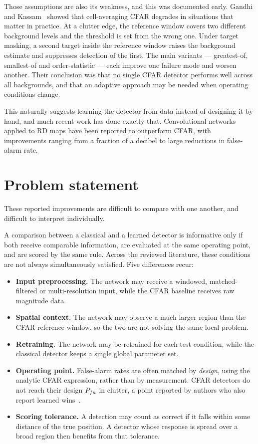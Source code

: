Those assumptions are also its weakness, and this was documented early. Gandhi and
Kassam~\cite{gandhi1988cfar} showed that cell-averaging CFAR degrades in situations that matter in
practice. At a clutter edge, the reference window covers two different background levels and the
threshold is set from the wrong one. Under target masking, a second target inside the reference
window raises the background estimate and suppresses detection of the first. The main variants ---
greatest-of, smallest-of and order-statistic --- each improve one failure mode and worsen another.
Their conclusion was that no single CFAR detector performs well across all backgrounds, and that an
adaptive approach may be needed when operating conditions change.

This naturally suggests learning the detector from data instead of designing it by hand, and much
recent work has done exactly that. Convolutional networks applied to RD maps have been reported to
outperform CFAR, with improvements ranging from a fraction of a decibel to large reductions in
false-alarm rate.

\section{Problem statement}
\label{sec:problem}

These reported improvements are difficult to compare with one another, and difficult to interpret
individually.

A comparison between a classical and a learned detector is informative only if both receive
comparable information, are evaluated at the same operating point, and are scored by the same rule.
Across the reviewed literature, these conditions are not always simultaneously satisfied. Five
differences recur:

\begin{itemize}
\itemsep2pt
\item \textbf{Input preprocessing.} The network may receive a windowed, matched-filtered or
multi-resolution input, while the CFAR baseline receives raw magnitude data.
\item \textbf{Spatial context.} The network may observe a much larger region than the CFAR reference
window, so the two are not solving the same local problem.
\item \textbf{Retraining.} The network may be retrained for each test condition, while the classical
detector keeps a single global parameter set.
\item \textbf{Operating point.} False-alarm rates are often matched by \emph{design}, using the
analytic CFAR expression, rather than by measurement. CFAR detectors do not reach their design
$P_{fa}$ in clutter, a point reported by authors who also report learned
wins~\cite{yavuz2021radcnn}.
\item \textbf{Scoring tolerance.} A detection may count as correct if it falls within some distance
of the true position. A detector whose response is spread over a broad region then benefits from
that tolerance.
\end{itemize}

